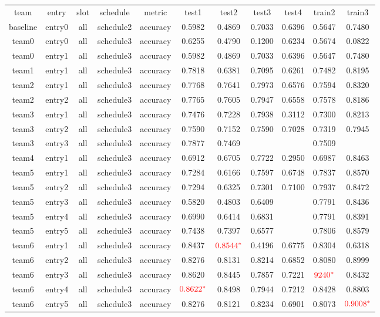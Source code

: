 \begin{footnotesize}
\begin{tabular}{c|c|c|c|c|c|c|c|c|c|c}
team&entry&slot&schedule&metric&test1&test2&test3&test4&train2&train3\\
baseline&entry0&all&schedule2&accuracy&0.5982&0.4869&0.7033&0.6396&0.5647&0.7480\\
team0&entry0&all&schedule3&accuracy&0.6255&0.4790&0.1200&0.6234&0.5674&0.0822\\
team0&entry1&all&schedule3&accuracy&0.5982&0.4869&0.7033&0.6396&0.5647&0.7480\\
team1&entry1&all&schedule3&accuracy&0.7818&0.6381&0.7095&0.6261&0.7482&0.8195\\
team2&entry1&all&schedule3&accuracy&0.7768&0.7641&0.7973&0.6576&0.7594&0.8320\\
team2&entry2&all&schedule3&accuracy&0.7765&0.7605&0.7947&0.6558&0.7578&0.8186\\
team3&entry1&all&schedule3&accuracy&0.7476&0.7228&0.7938&0.3112&0.7300&0.8213\\
team3&entry2&all&schedule3&accuracy&0.7590&0.7152&0.7590&0.7028&0.7319&0.7945\\
team3&entry3&all&schedule3&accuracy&0.7877&0.7469&&&0.7509&\\
team4&entry1&all&schedule3&accuracy&0.6912&0.6705&0.7722&0.2950&0.6987&0.8463\\
team5&entry1&all&schedule3&accuracy&0.7284&0.6166&0.7597&0.6748&0.7837&0.8570\\
team5&entry2&all&schedule3&accuracy&0.7294&0.6325&0.7301&0.7100&0.7937&0.8472\\
team5&entry3&all&schedule3&accuracy&0.5820&0.4803&0.6409&&0.7791&0.8436\\
team5&entry4&all&schedule3&accuracy&0.6990&0.6414&0.6831&&0.7791&0.8391\\
team5&entry5&all&schedule3&accuracy&0.7438&0.7397&0.6577&&0.7806&0.8579\\
team6&entry1&all&schedule3&accuracy&0.8437&{$\color{red}0.8544^*$}&0.4196&0.6775&0.8304&0.6318\\
team6&entry2&all&schedule3&accuracy&0.8276&0.8131&0.8214&0.6852&0.8080&0.8999\\
team6&entry3&all&schedule3&accuracy&0.8620&0.8445&0.7857&0.7221&{$\color{red}9240^*$}&0.8432\\
team6&entry4&all&schedule3&accuracy&{$\color{red}0.8622^*$}&0.8498&0.7944&0.7212&0.8428&0.8803\\
team6&entry5&all&schedule3&accuracy&0.8276&0.8121&0.8234&0.6901&0.8073&{$\color{red}0.9008^*$}\\

\end{tabular}
\end{footnotesize}
